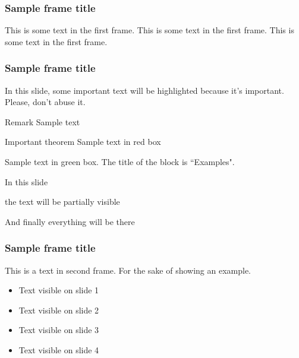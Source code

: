 
\begin{frame}
    \frametitle{Sample frame title}
    This is some text in the first frame. This is some text in the first frame. This is some text in the first frame.
\end{frame}


\begin{frame}
    \frametitle{Sample frame title}

    In this slide, some important text will be
    \alert{highlighted} because it's important.
    Please, don't abuse it.

    \begin{block}{Remark}
        Sample text
    \end{block}

    \begin{alertblock}{Important theorem}
        Sample text in red box
    \end{alertblock}

    \begin{examples}
        Sample text in green box. The title of the block is ``Examples".
    \end{examples}


\end{frame}

\begin{frame}
    In this slide \pause

    the text will be partially visible \pause

    And finally everything will be there
\end{frame}

\begin{frame}
    \frametitle{Sample frame title}
    This is a text in second frame.
    For the sake of showing an example.

    \begin{itemize}
        \item<1-> Text visible on slide 1
        \item<2-> Text visible on slide 2
        \item<3> Text visible on slide 3
        \item<4-> Text visible on slide 4
    \end{itemize}
\end{frame}

